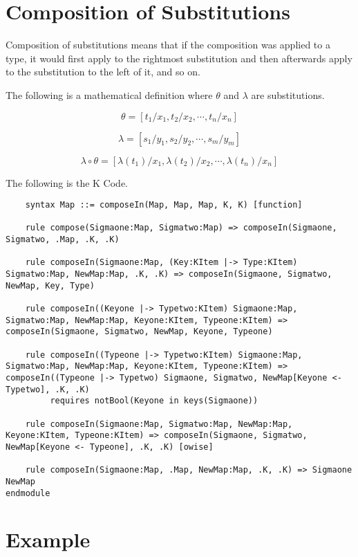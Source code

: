 \section{Composition of Substitutions}

Composition of substitutions means that if the composition was applied to a type, it would first apply to the rightmost substitution and then afterwards apply to the substitution to the left of it, and so on.

The following is a mathematical definition where $\theta$ and $\lambda$ are substitutions. \cite{Infer:TypeSub}

$$ \theta = [t_1 / x_1 , t_2 / x_2 , \cdots , t_n / x_n] $$

$$ \lambda = [s_1 / y_1 , s_2 / y_2 , \cdots , s_m / y_m] $$

$$ \lambda \circ \theta = [ \lambda(t_1) /x_1 , \lambda(t_2) / x_2, \cdots, \lambda(t_n) / x_n]$$

The following is the K Code.

\begin{lstlisting}
    syntax Map ::= composeIn(Map, Map, Map, K, K) [function]

    rule compose(Sigmaone:Map, Sigmatwo:Map) => composeIn(Sigmaone, Sigmatwo, .Map, .K, .K)

    rule composeIn(Sigmaone:Map, (Key:KItem |-> Type:KItem) Sigmatwo:Map, NewMap:Map, .K, .K) => composeIn(Sigmaone, Sigmatwo, NewMap, Key, Type)

    rule composeIn((Keyone |-> Typetwo:KItem) Sigmaone:Map, Sigmatwo:Map, NewMap:Map, Keyone:KItem, Typeone:KItem) => composeIn(Sigmaone, Sigmatwo, NewMap, Keyone, Typeone)

    rule composeIn((Typeone |-> Typetwo:KItem) Sigmaone:Map, Sigmatwo:Map, NewMap:Map, Keyone:KItem, Typeone:KItem) => composeIn((Typeone |-> Typetwo) Sigmaone, Sigmatwo, NewMap[Keyone <- Typetwo], .K, .K)
         requires notBool(Keyone in keys(Sigmaone))

    rule composeIn(Sigmaone:Map, Sigmatwo:Map, NewMap:Map, Keyone:KItem, Typeone:KItem) => composeIn(Sigmaone, Sigmatwo, NewMap[Keyone <- Typeone], .K, .K) [owise]

    rule composeIn(Sigmaone:Map, .Map, NewMap:Map, .K, .K) => Sigmaone NewMap
endmodule
\end{lstlisting}

\section{Example}

